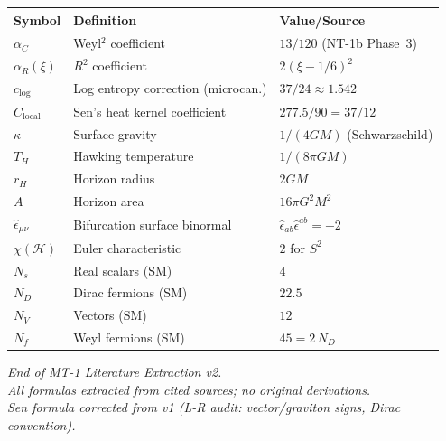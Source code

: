 \documentclass[12pt,a4paper]{article}
\theoremstyle{definition}
\theoremstyle{remark}
\begin{document}
\begin{center}
\begin{tabular}{lll}
\toprule
Symbol & Definition & Value/Source \\
\midrule
$\alpha_C$ & Weyl${}^2$ coefficient & $13/120$ (NT-1b Phase~3) \\
$\alpha_R(\xi)$ & $R^2$ coefficient & $2(\xi - 1/6)^2$ \\
$c_{\log}$ & Log entropy correction (microcan.) & $37/24 \approx 1.542$ \\
$C_{\mathrm{local}}$ & Sen's heat kernel coefficient & $277.5/90 = 37/12$ \\
$\kappa$ & Surface gravity & $1/(4GM)$ (Schwarzschild) \\
$T_H$ & Hawking temperature & $1/(8\pi GM)$ \\
$r_H$ & Horizon radius & $2GM$ \\
$A$ & Horizon area & $16\pi G^2 M^2$ \\
$\hat{\epsilon}_{\mu\nu}$ & Bifurcation surface binormal &
  $\hat{\epsilon}_{ab}\hat{\epsilon}^{ab} = -2$ \\
$\chi(\mathcal{H})$ & Euler characteristic & $2$ for $S^2$ \\
$N_s$ & Real scalars (SM) & $4$ \\
$N_D$ & Dirac fermions (SM) & $22.5$ \\
$N_V$ & Vectors (SM) & $12$ \\
$N_f$ & Weyl fermions (SM) & $45 = 2\,N_D$ \\
\bottomrule
\end{tabular}
\end{center}


\vfill
\begin{center}
\small\textit{End of MT-1 Literature Extraction v2.\\
All formulas extracted from cited sources; no original derivations.\\
Sen formula corrected from v1 (L-R audit: vector/graviton signs,
Dirac convention).}
\end{center}
\end{document}

